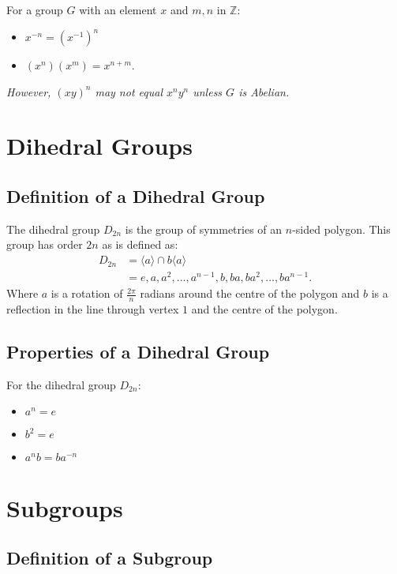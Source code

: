 \documentclass[a4paper, 12pt, twoside]{article}
\begin{document}
For a group $G$ with an element $x$ and $m, n$ in $\mathbb{Z}$:

\begin{itemize}
      \item $x^{-n} = (x^{-1})^n$
      \item $(x^n)(x^m) = x^{n + m}$.
\end{itemize}

\textit{However, $(xy)^n$ may not equal $x^ny^n$ unless $G$ is Abelian.}

\section{Dihedral Groups}

\subsection{Definition of a Dihedral Group}

The dihedral group $D_{2n}$ is the group of symmetries of an $n$-sided polygon.
This group has order $2n$ as is defined as:
\begin{align*}
      D_{2n} & = \langle a \rangle \cap b\langle a \rangle                        \\
             & = {e, a, a^2, \ldots, a^{n - 1}, b, ba, ba^2, \ldots, ba^{n - 1}}.
\end{align*}
Where $a$ is a rotation of $\frac{2\pi}{n}$ radians around the centre of the
polygon and $b$ is a reflection in the line through vertex $1$ and the centre
of the polygon.

\subsection{Properties of a Dihedral Group}

For the dihedral group $D_{2n}$:

\begin{itemize}
      \item $a^n = e$
      \item $b^2 = e$
      \item $a^nb = ba^{-n}$
\end{itemize}

\section{Subgroups}

\subsection{Definition of a Subgroup}
\end{document}

